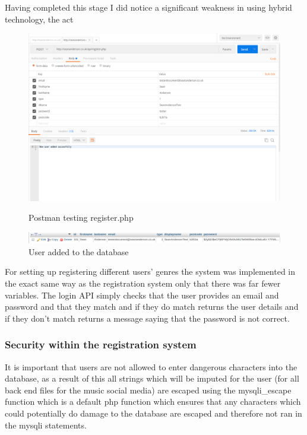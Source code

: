 Having completed this stage I did notice a significant weakness in using hybrid technology, the act
\begin{center} 
\begin{figure}[H]
\includegraphics[scale=0.45]{images/postman}
\caption{Postman testing register.php}
\includegraphics[scale=0.45]{images/db1}
\caption{User added to the database}
\end{figure}
\end{center}

For setting up registering different users' genres the system was implemented in the exact same way as the registration system only that there was far fewer variables. The login API simply checks that the user provides an email and password and that they match and if they do match returns the user details and if they don't match returns a message saying that the password is not correct.

\subsubsection{Security within the registration system}
It is important that users are not allowed to enter dangerous characters into the database, as a result of this all strings which will be imputed for the user (for all back end files for the music social media) are escaped using the mysqli\_escape function which is a default php function which ensures that any characters which could potentially do damage to the database are escaped and therefore not ran in the mysqli statements.

